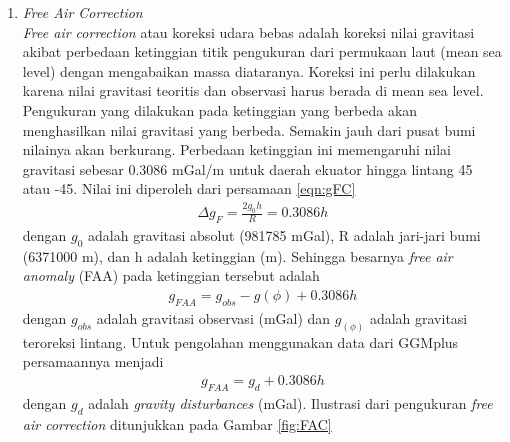 \begin{enumerate}
	\item \textit{Free Air Correction}\\
	\textit{Free air correction} atau koreksi udara bebas adalah koreksi nilai gravitasi akibat perbedaan ketinggian titik pengukuran dari permukaan laut (mean sea level) dengan mengabaikan massa diataranya. Koreksi ini perlu dilakukan karena nilai gravitasi teoritis dan observasi harus berada di mean sea level. Pengukuran yang dilakukan pada ketinggian yang berbeda akan menghasilkan nilai gravitasi yang berbeda. Semakin jauh dari pusat bumi nilainya akan berkurang. Perbedaan ketinggian ini memengaruhi nilai gravitasi sebesar 0.3086 mGal/m untuk daerah ekuator hingga lintang 45 atau -45. Nilai ini diperoleh dari persamaan \ref{eqn:gFC} \citep{SleepFujita}
	\begin{align}
		\Delta g_{F}=\frac{2g_{0}h}{R} = 0.3086h\label{eqn:gFC}
	\end{align}
	dengan $g_{0}$ adalah gravitasi absolut (981785 mGal), R adalah jari-jari bumi (6371000 m), dan h adalah ketinggian (m). Sehingga besarnya \textit{free air anomaly} (FAA) pada ketinggian tersebut adalah 
	\begin{align}
		g_{FAA}=g_{obs}-g(\phi)+0.3086h
	\end{align}
	dengan $g_{obs}$ adalah gravitasi observasi (mGal) dan $g_(\phi)$ adalah gravitasi teroreksi lintang. Untuk pengolahan menggunakan data dari GGMplus persamaannya menjadi
	\begin{align}
		g_{FAA}=g_{d}+0.3086h
	\end{align}
	dengan $g_{d}$ adalah \textit{gravity disturbances} (mGal). Ilustrasi dari pengukuran \textit{free air correction} ditunjukkan pada Gambar \ref{fig:FAC}

\end{enumerate}
